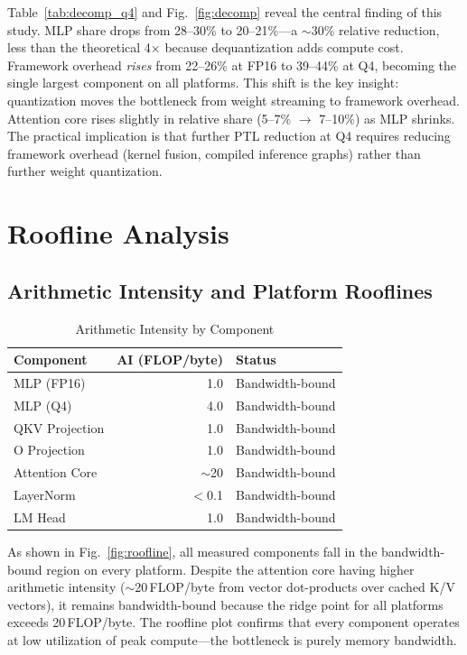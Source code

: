 \documentclass[conference]{IEEEtran}
\begin{document}
Table~\ref{tab:decomp_q4} and Fig.~\ref{fig:decomp} reveal the central finding of this study. MLP share drops from 28--30\% to 20--21\%---a ${\sim}$30\% relative reduction, less than the theoretical 4$\times$ because dequantization adds compute cost. Framework overhead \emph{rises} from 22--26\% at FP16 to 39--44\% at Q4, becoming the single largest component on all platforms. This shift is the key insight: quantization moves the bottleneck from weight streaming to framework overhead. Attention core rises slightly in relative share (5--7\% $\rightarrow$ 7--10\%) as MLP shrinks. The practical implication is that further PTL reduction at Q4 requires reducing framework overhead (kernel fusion, compiled inference graphs) rather than further weight quantization.

\section{Roofline Analysis}

\subsection{Arithmetic Intensity and Platform Rooflines}

\begin{table}[t]
\caption{Arithmetic Intensity by Component}
\label{tab:arithmetic_intensity}
\centering
\small
\begin{tabular}{lrl}
\toprule
\textbf{Component} & \textbf{AI (FLOP/byte)} & \textbf{Status} \\
\midrule
MLP (FP16)       & 1.0  & Bandwidth-bound \\
MLP (Q4)         & 4.0  & Bandwidth-bound \\
QKV Projection   & 1.0  & Bandwidth-bound \\
O Projection     & 1.0  & Bandwidth-bound \\
Attention Core   & $\sim$20  & Bandwidth-bound \\
LayerNorm        & $<$0.1  & Bandwidth-bound \\
LM Head          & 1.0  & Bandwidth-bound \\
\bottomrule
\end{tabular}
\end{table}

As shown in Fig.~\ref{fig:roofline}, all measured components fall in the bandwidth-bound region on every platform. Despite the attention core having higher arithmetic intensity (${\sim}$20\,FLOP/byte from vector dot-products over cached K/V vectors), it remains bandwidth-bound because the ridge point for all platforms exceeds 20\,FLOP/byte. The roofline plot confirms that every component operates at low utilization of peak compute---the bottleneck is purely memory bandwidth.
\end{document}

